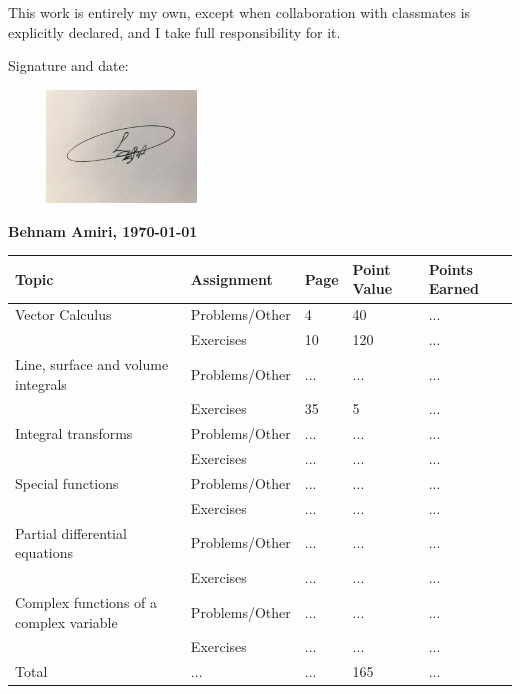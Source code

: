 \documentclass[fleqn]{article}
\begin{document}
\bigbreak

\Large This work is entirely my own, except when collaboration with classmates is explicitly declared, and I take full responsibility for it.

\bigbreak

\Large Signature and date:

\bigbreak

\bigbreak


\includegraphics[height=3cm, width=6cm]{signature.jpg}

\Large \textbf{ Behnam Amiri, \today }


\pagebreak

\begin{singlespace}
  \begin{tabular}{ |p{3cm}|||p{4cm}|p{2cm}|p{2cm}|p{2cm}|  }
      \hline
      Topic & Assignment & Page & Point Value & Points Earned \\
      \hline
      Vector Calculus & \cellcolor{contents} Problems/Other & \cellcolor{contents} 4 &\cellcolor{contents} 40 &\cellcolor{contents}  ... \\
      & \cellcolor{contents} Exercises &\cellcolor{contents}  10 & \cellcolor{contents}  120 &\cellcolor{contents}  ... \\
      \hline
      Line, surface and volume integrals & Problems/Other & ... & ... & ... \\
      & Exercises & 35 & 5 & ... \\
      \hline
      Integral transforms & \cellcolor{contents} Problems/Other &\cellcolor{contents}  ... &\cellcolor{contents}  ... & \cellcolor{contents} ... \\
      & \cellcolor{contents} Exercises &\cellcolor{contents}  ... &\cellcolor{contents}  ... &\cellcolor{contents}  ... \\
      \hline
      Special functions & Problems/Other & ... & ... & ... \\
      & Exercises & ... & ... & ... \\
      \hline
      Partial differential equations  &\cellcolor{contents} Problems/Other &\cellcolor{contents} ... &\cellcolor{contents} ... &\cellcolor{contents} ... \\
      & \cellcolor{contents} Exercises &\cellcolor{contents}  ... &\cellcolor{contents}  ... &\cellcolor{contents}  ... \\
      \hline
      Complex functions of a complex variable & Problems/Other & ...  & ... & ... \\
      & Exercises  & ...  & ... & ... \\
      \hline
      Total & ... & ... & 165 & ... \\
      \hline
  \end{tabular}
\end{singlespace}
\end{document}
